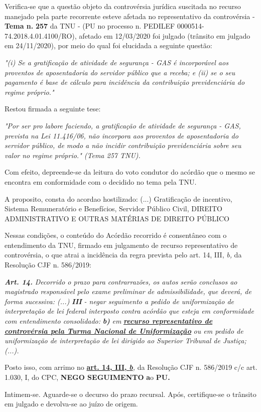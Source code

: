 \documentclass[12pt]{article}
\begin{document}
\justifying
\noindent Verifica-se que a questão objeto da controvérsia jurídica suscitada no recurso manejado pela parte recorrente esteve afetada no representativo da controvérsia - \textbf{Tema n. }\textbf{257} da TNU - (PU no processo n. PEDILEF 0000514-74.2018.4.01.4100/RO),  afetado em 12/03/2020 foi julgado (trânsito em julgado em 24/11/2020), por meio do qual foi elucidada a seguinte questão:

\noindent \textit{"(i) Se a gratificação de atividade de segurança - GAS é incorporável aos proventos de aposentadoria do servidor público que a receba;  e (ii) se o seu pagamento é base de cálculo para incidência da contribuição previdenciária do regime próprio."}

\noindent Restou firmada a seguinte tese:

\noindent \textit{"Por ser pro labore faciendo, a gratificação de atividade de segurança - GAS, prevista na Lei 11.416/06, não incorpora aos proventos de aposentadoria do servidor público, de modo a não incidir contribuição previdenciária sobre seu valor no regime próprio." (Tema 257 TNU).}

\noindent Com efeito, depreende-se da leitura do voto condutor do acórdão que o mesmo se encontra em conformidade com o decidido no  tema pela TNU.

\noindent A proposito, consta do acordao hostilizado: (...) Gratificação de incentivo, Sistema Remuneratório e Benefícios, Servidor Público Civil, DIREITO ADMINISTRATIVO E OUTRAS MATÉRIAS DE DIREITO PÚBLICO

\noindent Nessas condições, o conteúdo do Acórdão recorrido é consentâneo com o entendimento da TNU, firmado em julgamento de recurso representativo de controvérsia, o que atrai a incidência da regra prevista pelo art. 14, III, \textit{b,} da Resolução CJF n. 586/2019:

\noindent \textit{\textbf{Art. 14.}}\textit{ Decorrido o prazo para contrarrazões, os autos serão conclusos ao magistrado responsável pelo exame preliminar de admissibilidade, que deverá, de forma sucessiva: (...) }\textit{\textbf{III }}\textit{- negar seguimento a pedido de uniformização de interpretação de lei federal interposto contra acórdão que esteja em conformidade com entendimento consolidado: }\textit{\textbf{b)}}\textit{ em }\uline{\textit{\textbf{recurso representativo de controvérsia pela Turma Nacional de Uniformização}}}\textit{ ou em pedido de uniformização de interpretação de lei dirigido ao Superior Tribunal de Justiça;(...).}

\noindent Posto isso, com arrimo no \uline{\textbf{art. 14, III, }}\uline{\textit{\textbf{b}}}\textit{,} da Resolução CJF n. 586/2019 c/c art. 1.030, I, do CPC, \textbf{NEGO SEGUIMENTO }\textbf{a}o\textbf{ PU}\textbf{.}

\noindent Intimem-se. Aguarde-se o decurso do prazo recursal. Após, certifique-se o trânsito em julgado e devolva-se ao juízo de origem.
\end{document}
